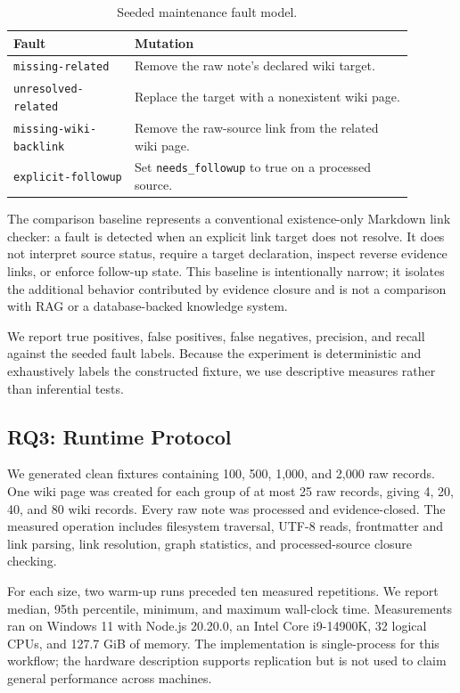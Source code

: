 \documentclass[preprint,12pt,a4paper]{elsarticle}
\begin{document}
\begin{table}[H]
\centering
\small
\begin{tabular}{>{\raggedright\arraybackslash}p{0.27\linewidth}p{0.62\linewidth}}
\toprule
\normalfont Fault & Mutation \\
\midrule
\texttt{missing-related} & Remove the raw note's declared wiki target. \\
\texttt{unresolved-related} & Replace the target with a nonexistent wiki page. \\
\texttt{missing-wiki-}\allowbreak\texttt{backlink} & Remove the raw-source link from the related wiki page. \\
\texttt{explicit-followup} & Set \texttt{needs\_followup} to true on a processed source. \\
\bottomrule
\end{tabular}
\caption{Seeded maintenance fault model.}
\label{tab:faultmodel}
\end{table}

The comparison baseline represents a conventional existence-only Markdown link
checker: a fault is detected when an explicit link target does not resolve. It
does not interpret source status, require a target declaration, inspect reverse
evidence links, or enforce follow-up state. This baseline is intentionally
narrow; it isolates the additional behavior contributed by evidence closure
and is not a comparison with RAG or a database-backed knowledge system.

We report true positives, false positives, false negatives, precision, and
recall against the seeded fault labels. Because the experiment is deterministic
and exhaustively labels the constructed fixture, we use descriptive measures
rather than inferential tests.

\subsection{RQ3: Runtime Protocol}

We generated clean fixtures containing 100, 500, 1,000, and 2,000 raw records.
One wiki page was created for each group of at most 25 raw records, giving 4,
20, 40, and 80 wiki records. Every raw note was processed and evidence-closed.
The measured operation includes filesystem traversal, UTF-8 reads, frontmatter
and link parsing, link resolution, graph statistics, and processed-source
closure checking.

For each size, two warm-up runs preceded ten measured repetitions. We report
median, 95th percentile, minimum, and maximum wall-clock time. Measurements ran
on Windows 11 with Node.js 20.20.0, an Intel Core i9-14900K, 32 logical CPUs,
and 127.7 GiB of memory. The implementation is single-process for this workflow;
the hardware description supports replication but is not used to claim general
performance across machines.
\end{document}
